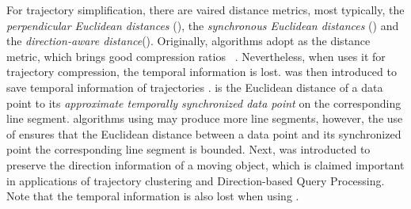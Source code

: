 %
For trajectory simplification, there are vaired distance metrics, most typically, the \emph{perpendicular Euclidean distances} (\ped), the \emph{synchronous Euclidean distances}\cite{Meratnia:Spatiotemporal} (\sed) and the \emph{direction-aware distance}\cite{Long:Direction, Zhang:Evaluation}(\dad).
Originally, \lsa algorithms adopt \ped as the distance metric, which brings good compression ratios~ \cite{Douglas:Peucker, Hershberger:Speeding, Liu:BQS, Muckell:Compression, Chen:Trajectory, Cao:Spatio, Shi:Survey}. Nevertheless, when uses it for trajectory compression, the temporal information is lost. 
%
\sed was then introduced to save temporal information of trajectories \cite{Meratnia:Spatiotemporal}. \sed is the Euclidean distance of a data point to its \emph{approximate temporally synchronized data point} \cite{Meratnia:Spatiotemporal} on the corresponding line segment. 
\lsa algorithms using \sed may produce more line segments, however, the use of \sed ensures that the Euclidean distance between a data point and its synchronized point \wrt the corresponding line segment is bounded. 
%
Next, \dad\cite{Long:Direction, Zhang:Evaluation} was introducted to preserve the direction information of a moving object, which is claimed important in applications of trajectory clustering and Direction-based Query Processing. Note that the temporal information is also lost when using \dad.

